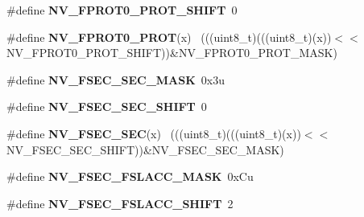 \begin{DoxyCompactItemize}
\item 
\hypertarget{group___n_v___register___masks_gaaae2badd9a03af803a09537c6c89382a}{}\#define {\bfseries N\+V\+\_\+\+F\+P\+R\+O\+T0\+\_\+\+P\+R\+O\+T\+\_\+\+S\+H\+I\+F\+T}~0\label{group___n_v___register___masks_gaaae2badd9a03af803a09537c6c89382a}

\item 
\hypertarget{group___n_v___register___masks_ga1e5d89ac9195a6ed439fefb7d2200cac}{}\#define {\bfseries N\+V\+\_\+\+F\+P\+R\+O\+T0\+\_\+\+P\+R\+O\+T}(x)                                            ~(((uint8\+\_\+t)(((uint8\+\_\+t)(x))$<$$<$N\+V\+\_\+\+F\+P\+R\+O\+T0\+\_\+\+P\+R\+O\+T\+\_\+\+S\+H\+I\+F\+T))\&N\+V\+\_\+\+F\+P\+R\+O\+T0\+\_\+\+P\+R\+O\+T\+\_\+\+M\+A\+S\+K)\label{group___n_v___register___masks_ga1e5d89ac9195a6ed439fefb7d2200cac}

\item 
\hypertarget{group___n_v___register___masks_gab159c721c6cde1f629b630c573da8ea9}{}\#define {\bfseries N\+V\+\_\+\+F\+S\+E\+C\+\_\+\+S\+E\+C\+\_\+\+M\+A\+S\+K}~0x3u\label{group___n_v___register___masks_gab159c721c6cde1f629b630c573da8ea9}

\item 
\hypertarget{group___n_v___register___masks_ga92a819b24b0472a83857ddd2d950ab08}{}\#define {\bfseries N\+V\+\_\+\+F\+S\+E\+C\+\_\+\+S\+E\+C\+\_\+\+S\+H\+I\+F\+T}~0\label{group___n_v___register___masks_ga92a819b24b0472a83857ddd2d950ab08}

\item 
\hypertarget{group___n_v___register___masks_gad5a8a12d54435f49c62b7f43b53513a8}{}\#define {\bfseries N\+V\+\_\+\+F\+S\+E\+C\+\_\+\+S\+E\+C}(x)                                                  ~(((uint8\+\_\+t)(((uint8\+\_\+t)(x))$<$$<$N\+V\+\_\+\+F\+S\+E\+C\+\_\+\+S\+E\+C\+\_\+\+S\+H\+I\+F\+T))\&N\+V\+\_\+\+F\+S\+E\+C\+\_\+\+S\+E\+C\+\_\+\+M\+A\+S\+K)\label{group___n_v___register___masks_gad5a8a12d54435f49c62b7f43b53513a8}

\item 
\hypertarget{group___n_v___register___masks_ga8fd3b6696c82aa96017fe25be34d19c9}{}\#define {\bfseries N\+V\+\_\+\+F\+S\+E\+C\+\_\+\+F\+S\+L\+A\+C\+C\+\_\+\+M\+A\+S\+K}~0x\+Cu\label{group___n_v___register___masks_ga8fd3b6696c82aa96017fe25be34d19c9}

\item 
\hypertarget{group___n_v___register___masks_gaba549ee99b8ca1af3531eafd5746f6b6}{}\#define {\bfseries N\+V\+\_\+\+F\+S\+E\+C\+\_\+\+F\+S\+L\+A\+C\+C\+\_\+\+S\+H\+I\+F\+T}~2\label{group___n_v___register___masks_gaba549ee99b8ca1af3531eafd5746f6b6}


\end{DoxyCompactItemize}
